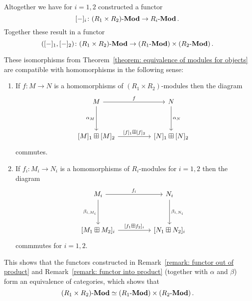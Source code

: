 

\begin{remark}
  \label{remark: functor into product}
  Altogether we have for $i = 1, 2$ constructed a functor
  \[
            [-]_i
    \colon  (R_1 \times R_2)\text{-}\mathbf{Mod}
    \to     R_i\text{-}\mathbf{Mod} \,.
  \]
  Together these result in a functor
  \[
            ([-]_1, [-]_2)
    \colon  (R_1 \times R_2)\text{-}\mathbf{Mod}
    \to     (R_1\text{-}\mathbf{Mod}) \times (R_2\text{-}\mathbf{Mod}) \,.
  \]
\end{remark}


\begin{theorem}
  \label{theorem: equivalence of modules for morphisms}
  These isomorphisms from Theorem~\ref{theorem: equivalence of modules for objects} are compatible with homomorphisms in the following sense:
  \begin{enumerate}
    \item
      If $f \colon M \to N$ is a homomorphisms of $(R_1 \times R_2)$-modules then the diagram
      \[
        \begin{tikzcd}[sep = huge]
            M
            \arrow{r}[above]{f}
            \arrow{d}[left]{\alpha_M}
          & N
            \arrow{d}[right]{\alpha_N}
          \\
            {[M]_1} \boxplus {[M]_2}
            \arrow{r}[above]{{[f]_1} \boxplus {[f]_2}}
          & {[N]_1} \boxplus {[N]_2}
        \end{tikzcd}
      \]
      commutes.
    \item
      If $f_i \colon M_i \to N_i$ is a homomorphisms of $R_i$-modules for $i = 1, 2$ then the diagram
      \[
        \begin{tikzcd}[sep = huge]
            M_i
            \arrow{r}[above]{f_i}
            \arrow{d}[left]{\beta_{i, M_i}}
          & N_i
            \arrow{d}[right]{\beta_{i, N_i}}
          \\
            {[M_1 \boxplus M_2]_i}
            \arrow{r}[above]{{[f_1 \boxplus f_2]_i}}
          & {[N_1 \boxplus N_2]_i}
        \end{tikzcd}
      \]
      commmutes for $i = 1, 2$.
  \end{enumerate}
\end{theorem}




\begin{remark}
  This shows that the functors constructed in Remark~\ref{remark: functor out of product} and Remark~\ref{remark: functor into product} (together with $\alpha$ and $\beta$) form an equivalence of categories, which shows that
  \[
            (R_1 \times R_2)\text{-}\mathbf{Mod}
    \simeq  (R_1\text{-}\mathbf{Mod}) \times (R_2\text{-}\mathbf{Mod}) \,.
  \]
\end{remark}


